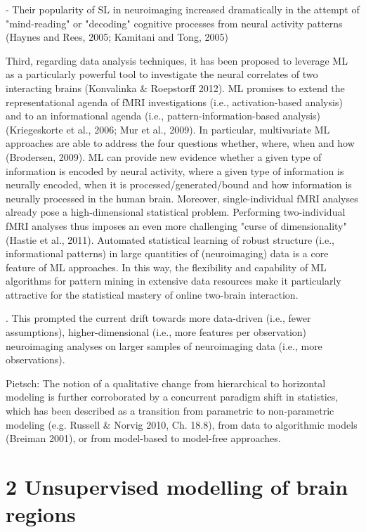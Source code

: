 \documentclass[authoryear,review,3p]{elsarticle}
\begin{document}
- Their popularity of SL in neuroimaging increased dramatically in the attempt of "mind-reading" or "decoding" cognitive processes from neural activity patterns (Haynes and Rees, 2005; Kamitani and Tong, 2005)


Third, regarding data analysis techniques, it has been proposed to leverage ML as a particularly powerful tool to investigate the neural correlates of two interacting brains (Konvalinka & Roepstorff 2012). ML promises to extend the representational agenda of fMRI investigations (i.e., activation-based analysis) and to an informational agenda (i.e., pattern-information-based analysis) (Kriegeskorte et al., 2006; Mur et al., 2009). In particular, multivariate ML approaches are able to address the four questions whether, where, when and how (Brodersen, 2009). ML can provide new evidence whether a given type of information is encoded by neural activity, where a given type of information is neurally encoded, when it is processed/generated/bound and how information is neurally processed in the human brain. Moreover, single-individual fMRI analyses already pose a high-dimensional statistical problem. Performing two-individual fMRI analyses thus imposes an even more challenging "curse of dimensionality" (Hastie et al., 2011). Automated statistical learning of robust structure (i.e., informational patterns) in large quantities of (neuroimaging) data is a core feature of ML approaches. In this way, the flexibility and capability of ML algorithms for pattern mining in extensive data resources make it particularly attractive for the statistical mastery of online two-brain interaction.

. This prompted the current drift towards more data-driven (i.e., fewer assumptions), higher-dimensional (i.e., more features per observation) neuroimaging analyses on larger samples of neuroimaging data (i.e., more observations).


Pietsch:
The notion of a qualitative change from hierarchical to horizontal modeling is further corroborated by a concurrent paradigm shift in statistics, which has been described as a transition from parametric to non-parametric modeling (e.g. Russell & Norvig 2010, Ch. 18.8), from data to algorithmic models (Breiman 2001), or from model-based to model-free approaches.



\section*{2 Unsupervised modelling of brain regions}
\end{document}
